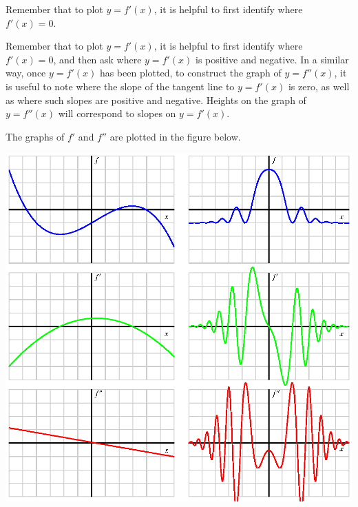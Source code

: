 \begin{smallhint}
Remember that to plot $y = f'(x)$, it is helpful to first identify where $f'(x) = 0.$
\end{smallhint}
\begin{bighint}
Remember that to plot $y = f'(x)$, it is helpful to first identify where $f'(x) = 0$, and then ask where $y = f'(x)$ is positive and negative.  In a similar way, once $y = f'(x)$ has been plotted, to construct the graph of $y=f''(x)$, it is useful to note where the slope of the tangent line to $y = f'(x)$ is zero, as well as where such slopes are positive and negative.  Heights on the graph of $y = f''(x)$ will correspond to slopes on $y = f'(x)$.
\end{bighint}
\begin{activitySolution}
The graphs of $f'$ and $f''$ are plotted in the figure below.
\begin{center}
\includegraphics{figures/1_6_Act2Soln.eps}
\end{center}
\end{activitySolution}
\aftera
